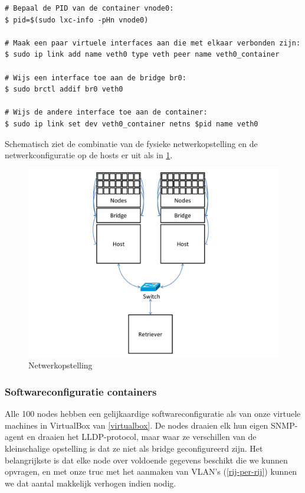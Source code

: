 \begin{lstlisting}[caption={Linux containers verbinden met een bridge\cite{lxc-config}}]
# Bepaal de PID van de container vnode0:
$ pid=$(sudo lxc-info -pHn vnode0)

# Maak een paar virtuele interfaces aan die met elkaar verbonden zijn:
$ sudo ip link add name veth0 type veth peer name veth0_container

# Wijs een interface toe aan de bridge br0:
$ sudo brctl addif br0 veth0

# Wijs de andere interface toe aan de container:
$ sudo ip link set dev veth0_container netns $pid name veth0
\end{lstlisting}

Schematisch ziet de combinatie van de fysieke netwerkopstelling en de netwerkconfiguratie op de hosts er uit als in \cref{fig-vwall-opstelling}.

\begin{figure}[h]
	\centering
	\includegraphics[scale=0.50]{figures/virtual-wall-opstelling}
	\caption{Netwerkopstelling \vwall{}}
	\label{fig-vwall-opstelling}
\end{figure}



\subsubsection{Softwareconfiguratie containers}

Alle 100 nodes hebben een gelijkaardige softwareconfiguratie als van onze virtuele machines in VirtualBox van \cref{virtualbox}.
De nodes draaien elk hun eigen SNMP-agent en draaien het LLDP-protocol,
maar waar ze verschillen van de kleinschalige opstelling is dat ze niet als bridge geconfigureerd zijn.
Het belangrijkste is dat elke node over voldoende gegevens beschikt die we kunnen opvragen,
en met onze truc met het aanmaken van VLAN's (\cref{rij-per-rij}) kunnen we dat aantal makkelijk verhogen indien nodig.


